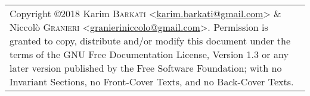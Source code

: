 \documentclass[a4paper, landscape, 9pt]{extarticle}
\newcommand{\email}[1]{\href{mailto:#1}{\textsf{#1}}}
\begin{document}
\begin{multicols}{3}
  \medskip{} 
  \noindent{}
  \begin{tabularx}{9cm}{X}
    \tiny{Copyright \copyright{2018} Karim \textsc{Barkati} <\email{karim.barkati@gmail.com}> \& Niccolò \textsc{Granieri} <\email{granieriniccolo@gmail.com}>. Permission is granted to copy, distribute and/or modify this document under the terms of the GNU Free Documentation License, Version 1.3 or any later version published by the Free Software Foundation; with no Invariant Sections, no Front-Cover Texts, and no Back-Cover Texts.}
  \end{tabularx}


\end{multicols}
\end{document}
